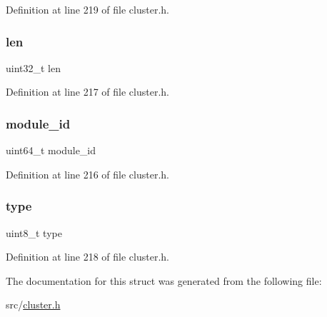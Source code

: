 Definition at line 219 of file cluster.\+h.

\mbox{\label{structcluster_msg_module_a96bbf959016e4411c9e6b9812a8be60a}} 
\subsubsection{\texorpdfstring{len}{len}}
{\footnotesize\ttfamily uint32\+\_\+t len}



Definition at line 217 of file cluster.\+h.

\mbox{\label{structcluster_msg_module_a5c568ad76933cdbb1f61b40781917492}} 
\subsubsection{\texorpdfstring{module\+\_\+id}{module\_id}}
{\footnotesize\ttfamily uint64\+\_\+t module\+\_\+id}



Definition at line 216 of file cluster.\+h.

\mbox{\label{structcluster_msg_module_a1d127017fb298b889f4ba24752d08b8e}} 
\subsubsection{\texorpdfstring{type}{type}}
{\footnotesize\ttfamily uint8\+\_\+t type}



Definition at line 218 of file cluster.\+h.



The documentation for this struct was generated from the following file\+:\begin{DoxyCompactItemize}
\item 
src/\hyperlink{cluster_8h}{cluster.\+h}\end{DoxyCompactItemize}

